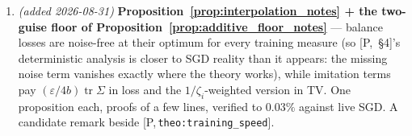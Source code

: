 \documentclass[11pt]{article}
\theoremstyle{definition}
\theoremstyle{remark}
\newcommand{\paperref}[1]{[P,\,\texttt{#1}]}   %
\begin{document}
\begin{enumerate}
    (Lemma~\ref{lem:eq10_occupation_notes} + Propositions~\ref{prop:two_timescale_notes},
    \ref{prop:constants_path_notes}, \ref{prop:gap_collapse_notes}): flow regularization with a
    trained backward policy \emph{is} gradient descent on $\bar\sigma$ along the balanced
    manifold, its endpoint is the OT solution of \citet{maksimov2026ot}, and the walk is
    priced by exactly the constants of [P,~\S4], ending at the collapse-floor face. This
    is a paper-scale contribution rather than an appendix remark --- likely a follow-up
    with \S\ref{sec:shape_notes}, not a Phase-4 promotion; recorded here so the decision is
    conscious. Lemma~\ref{lem:eq10_occupation_notes} alone, though, is three lines and
    immediately quotable against \citet{morozov2025revisiting}'s Eq.~10.
    \item \emph{(added 2026-08-31)} \textbf{Proposition~\ref{prop:interpolation_notes} +
    the two-guise floor of Proposition~\ref{prop:additive_floor_notes}} --- balance losses are
    noise-free at their optimum for every training measure (so [P,~\S4]'s deterministic
    analysis is closer to SGD reality than it appears: the missing noise term vanishes
    exactly where the theory works), while imitation terms pay
    $(\varepsilon/4b)\operatorname{tr}\Sigma$ in loss and the $1/\zeta_i$-weighted
    version in TV. One proposition each, proofs of a few lines, verified to $0.03\%$
    against live SGD. A candidate remark beside \paperref{theo:training\_speed}.
\end{enumerate}



\end{document}
